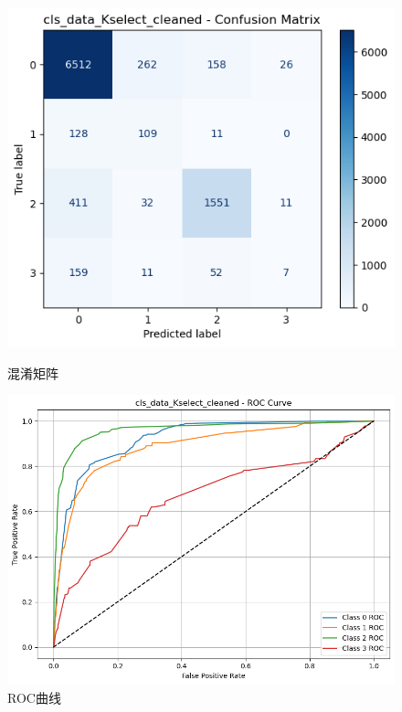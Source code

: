 \documentclass[10pt]{article}
\begin{document}
\begin{figure}[H]
\centering
\begin{minipage}[t]{0.45\textwidth}
  \centering
  \includegraphics[width=\linewidth]{cls_lda_10sc.png}
  \caption{混淆矩阵}
  \label{fig:53}
\end{minipage}
\hfill
\begin{minipage}[t]{0.52\textwidth}
  \centering
  \includegraphics[width=\linewidth]{cls_lda_10sc2.png}
  \caption{ROC曲线}
  \label{fig:54}
\end{minipage}
\end{figure}
\end{document}

